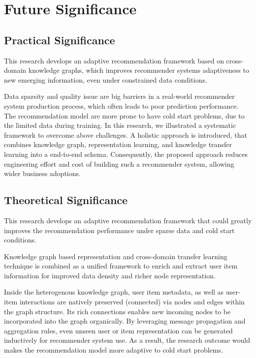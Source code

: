 \section{Future Significance}

\subsection{Practical Significance}
This research develops an adaptive recommendation framework based on cross-domain knowledge graphs, which improves recommender systems adaptiveness to new emerging information, even under constrained data conditions.

Data sparsity and quality issue are big barriers in a real-world recommender system production process, which often leads to poor prediction performance. The recommendation model are more prone to have cold start problems, due to the limited data during training. In this research, we illustrated a systematic framework to overcome above challenges. A holistic approach is introduced, that combines knowledge graph, representation learning, and knowledge transfer learning into a end-to-end schema. Consequently, the proposed approach reduces engineering effort and cost of building such a recommender system, allowing wider business adoptions.


\subsection{Theoretical Significance}
This research develops an adaptive recommendation framework that could greatly improves the recommendation performance under sparse data and cold start conditions.

Knowledge graph based representation and cross-domain transfer learning technique is combined as a unified framework to enrich and extract user item information for improved data density and richer node representation. 

Inside the heterogenous knowledge graph, user item metadata, as well as user-item interactions are natively preserved (connected) via nodes and edges within the graph structure. Its rich connections enables new incoming nodes to be incorporated into the graph organically. By leveraging message propagation and aggregation rules, even unseen user or item representation can be generated inductively for recommender system use. As a result, the research outcome would makes the recommendation model more adaptive to cold start problems.

